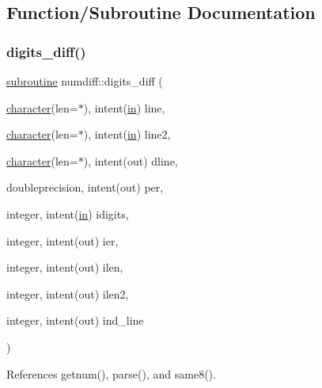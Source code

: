 \subsection{Function/\+Subroutine Documentation}
\mbox{\label{numdiff_8f90_a52df4f6514ae8b40384687c5e7a94445}} 
\subsubsection{\texorpdfstring{digits\+\_\+diff()}{digits\_diff()}}
{\footnotesize\ttfamily \hyperlink{M__stopwatch_83_8txt_acfbcff50169d691ff02d4a123ed70482}{subroutine} numdiff\+::digits\+\_\+diff (\begin{DoxyParamCaption}\item[{\hyperlink{option__stopwatch_83_8txt_abd4b21fbbd175834027b5224bfe97e66}{character}(len=$\ast$), intent(\hyperlink{M__journal_83_8txt_afce72651d1eed785a2132bee863b2f38}{in})}]{line,  }\item[{\hyperlink{option__stopwatch_83_8txt_abd4b21fbbd175834027b5224bfe97e66}{character}(len=$\ast$), intent(\hyperlink{M__journal_83_8txt_afce72651d1eed785a2132bee863b2f38}{in})}]{line2,  }\item[{\hyperlink{option__stopwatch_83_8txt_abd4b21fbbd175834027b5224bfe97e66}{character}(len=$\ast$), intent(out)}]{dline,  }\item[{doubleprecision, intent(out)}]{per,  }\item[{integer, intent(\hyperlink{M__journal_83_8txt_afce72651d1eed785a2132bee863b2f38}{in})}]{idigits,  }\item[{integer, intent(out)}]{ier,  }\item[{integer, intent(out)}]{ilen,  }\item[{integer, intent(out)}]{ilen2,  }\item[{integer, intent(out)}]{ind\+\_\+line }\end{DoxyParamCaption})}



References getnum(), parse(), and same8().

